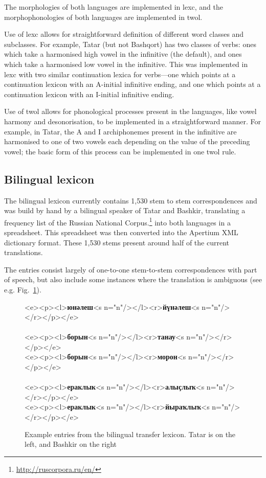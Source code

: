 \documentclass[11pt,a4paper]{article}
\begin{document}
The morphologies of both languages are implemented in lexc, and the morphophonologies of both languages are implemented in twol.

Use of lexc allows for straightforward definition of different word classes and subclasses.  For example, Tatar (but not Bashqort) has two classes of verbs: ones which take a harmonised high vowel in the infinitive (the default), and ones which take a harmonised low vowel in the infinitive.  This was implemented in lexc with two similar continuation lexica for verbs---one which points at a continuation lexicon with an A-initial infinitive ending, and one which points at a continuation lexicon with an I-initial infinitive ending.

Use of twol allows for phonological processes present in the languages, like vowel harmony and desonorisation, to be implemented in a straightforward manner.  For example, in Tatar, the A and I archiphonemes present in the infinitive are harmonised to one of two vowels each depending on the value of the preceding vowel; the basic form of this process can be implemented in one twol rule.

\subsection{Bilingual lexicon}

The bilingual lexicon currently contains 1,530 stem to stem correspondences and was build by hand by a bilingual 
speaker of Tatar and Bashkir, translating a frequency list of the Russian National Corpus.\footnote{\url{http://ruscorpora.ru/en/}}
into both languages in a spreadsheet. This spreadsheet was then converted into the Apertium
XML dictionary format. These 1,530 stems present around half of the current translations.

The entries consist largely of one-to-one stem-to-stem correspondences with part of speech, but also
include some instances where the translation is ambiguous (see e.g. Fig.~\ref{fig:bidix}).

\begin{figure}
\begin{center}
\begin{texttt}
    <e><p><l>\textbf{юнәлеш}<s n="n"/></l><r>\textbf{йүнәлеш}<s n="n"/></r></p></e> \\
~\\
    <e><p><l>\textbf{борын}<s n="n"/></l><r>\textbf{танау}<s n="n"/></r></p></e> \\
    <e><p><l>\textbf{борын}<s n="n"/></l><r>\textbf{морон}<s n="n"/></r></p></e> \\
~\\
    <e><p><l>\textbf{ераклык}<s n="n"/></l><r>\textbf{алыҫлыҡ}<s n="n"/></r></p></e> \\
    <e><p><l>\textbf{ераклык}<s n="n"/></l><r>\textbf{йыраҡлыҡ}<s n="n"/></r></p></e>

\end{texttt}
\end{center}
\caption{Example entries from the bilingual transfer lexicon. Tatar is on the left, and Bashkir on the right}
\label{fig:bidix}
\end{figure}
\end{document}

